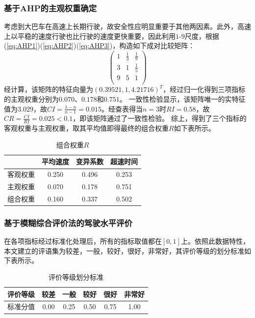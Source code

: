\documentclass[bwprint]{cumcmthesis}
\begin{document}
            \subsubsection{基于AHP的主观权重确定}
            考虑到大巴车在高速上长期行驶，故安全性应明显重要于其他两因素。此外，高速上以平稳的速度行驶也比行驶的速度更快重要，因此利用$1$-$9$尺度，根据(\ref{eq:AHP1})(\ref{eq:AHP2})(\ref{eq:AHP3})，构造如下成对比较矩阵：
            \[
            \begin{pmatrix}
                1 & \frac{1}{3} & \frac{1}{9}  \\
                3 & 1 & \frac{1}{5}  \\
                9 & 5 & 1  \\
            \end{pmatrix}
            \]
            经计算，该矩阵的特征向量为$(0.39521,1,4.21716)^T$，经过归一化得到三项指标的主观权重分别为$0.070$、$0.178$和$0.751$。
            一致性检验显示，该矩阵唯一的实特征值为$3.029$，故$CI=\frac{\lambda-n}{n-1}=0.015$。经查表得当$n=3$时$RI=0.58$，故$CR=\frac{CI}{RI}=0.025<0.1$，即该矩阵通过了一致性检验。
            综上，得到了三个指标的客观权重与主观权重，取其平均值即得最终的组合权重$R$如下表所示。
            \begin{table}[htbp]
                \centering
                \caption{组合权重$R$}
                    \begin{tabular}{|c|c|c|c|}
                    \hline
                    & 平均速度 & 变异系数 & 超速时间 \\
                    \hline
                    客观权重  & 0.250 & 0.496 & 0.253 \\
                    \hline
                    主观权重  & 0.070 & 0.178 & 0.751 \\
                    \hline
                    组合权重  & 0.160 & 0.337 & 0.502 \\
                    \hline
                    \end{tabular}
                \label{tab:eight}
              \end{table}
            \subsubsection{基于模糊综合评价法的驾驶水平评价}
            在各项指标经过标准化处理后，所有的指标取值都在$[0,1]$上。依照此数据特性，本文建立的评语集为${\text{较差，一般，较好，很好，非常好}}$，其评价等级的划分标准如下表所示。
            \begin{table}[htbp]
                \centering
                \caption{评价等级划分标准}
                    \begin{tabular}{|c|c|c|c|c|c|}
                    \hline
                    评价等级  & 较差    & 一般    & 较好    & 很好    & 非常好 \\
                    \hline
                    标准分值  & 0.00     & 0.25  & 0.50   & 0.75  & 1.00 \\
                    \hline
                    \end{tabular}
                \label{tab:nine}
            \end{table}
            
\end{document}
